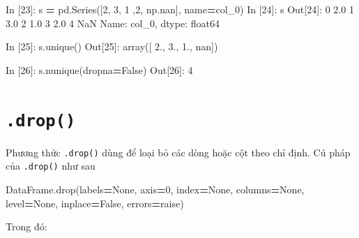 \documentclass[
]{book}
\newenvironment{Shaded}{\begin{snugshade}}{\end{snugshade}}
\newcommand{\DecValTok}[1]{\textcolor[rgb]{0.00,0.00,0.81}{#1}}
\newcommand{\FloatTok}[1]{\textcolor[rgb]{0.00,0.00,0.81}{#1}}
\newcommand{\NormalTok}[1]{#1}
\newcommand{\OperatorTok}[1]{\textcolor[rgb]{0.81,0.36,0.00}{\textbf{#1}}}
\newcommand{\StringTok}[1]{\textcolor[rgb]{0.31,0.60,0.02}{#1}}
\newcommand{\VariableTok}[1]{\textcolor[rgb]{0.00,0.00,0.00}{#1}}
\begin{document}
\begin{Shaded}
\begin{Highlighting}[]
\NormalTok{In [}\DecValTok{23}\NormalTok{]: s }\OperatorTok{=}\NormalTok{ pd.Series([}\DecValTok{2}\NormalTok{, }\DecValTok{3}\NormalTok{, }\DecValTok{1}\NormalTok{ ,}\DecValTok{2}\NormalTok{, np.nan], name}\OperatorTok{=}\StringTok{\textquotesingle{}col\_0\textquotesingle{}}\NormalTok{)}
\NormalTok{In [}\DecValTok{24}\NormalTok{]: s}
\NormalTok{Out[}\DecValTok{24}\NormalTok{]:}
\DecValTok{0}    \FloatTok{2.0}
\DecValTok{1}    \FloatTok{3.0}
\DecValTok{2}    \FloatTok{1.0}
\DecValTok{3}    \FloatTok{2.0}
\DecValTok{4}\NormalTok{    NaN}
\NormalTok{Name: col\_0, dtype: float64}

\NormalTok{In [}\DecValTok{25}\NormalTok{]: s.unique()}
\NormalTok{Out[}\DecValTok{25}\NormalTok{]: array([ }\FloatTok{2.}\NormalTok{,  }\FloatTok{3.}\NormalTok{,  }\FloatTok{1.}\NormalTok{, nan])}

\NormalTok{In [}\DecValTok{26}\NormalTok{]: s.nunique(dropna}\OperatorTok{=}\VariableTok{False}\NormalTok{)}
\NormalTok{Out[}\DecValTok{26}\NormalTok{]: }\DecValTok{4}
\end{Highlighting}
\end{Shaded}

\hypertarget{drop}{%
\section{\texorpdfstring{\texttt{.drop()}}{.drop()}}\label{drop}}

Phương thức \texttt{.drop()} dùng để loại bỏ các dòng hoặc cột theo chỉ định.
Cú pháp của \texttt{.drop()} như sau

\begin{Shaded}
\begin{Highlighting}[]
\NormalTok{DataFrame.drop(labels}\OperatorTok{=}\VariableTok{None}\NormalTok{, axis}\OperatorTok{=}\DecValTok{0}\NormalTok{, index}\OperatorTok{=}\VariableTok{None}\NormalTok{, columns}\OperatorTok{=}\VariableTok{None}\NormalTok{, level}\OperatorTok{=}\VariableTok{None}\NormalTok{, inplace}\OperatorTok{=}\VariableTok{False}\NormalTok{, errors}\OperatorTok{=}\StringTok{\textquotesingle{}raise\textquotesingle{}}\NormalTok{)}
\end{Highlighting}
\end{Shaded}

Trong đó:
\end{document}
